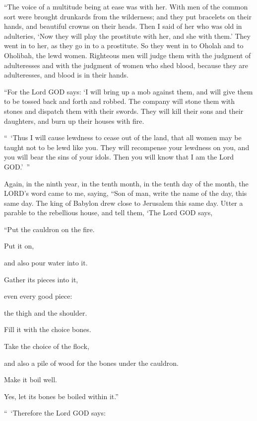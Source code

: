 \myverse{}“The voice of a multitude being at ease was with her. With men
of the common sort were brought drunkards from the wilderness; and they put bracelets on their hands,
and beautiful crowns on their heads.
\myverse{}Then I said of her who was old in adulteries, ‘Now they will play the prostitute
with her, and she with them.’
\myverse{}They went in to her, as they go in to a prostitute. So they went in to Oholah
and to Oholibah, the lewd women.
\myverse{}Righteous men will judge them with the judgment of adulteresses and with
the judgment of women who shed blood, because they are adulteresses, and blood is in their hands.

\myverse{}“For the Lord GOD says: ‘I will bring up a mob against them,
and will give them to be tossed back and forth and robbed.
\myverse{}The company will stone them with stones and dispatch them with their swords.
They will kill their sons and their daughters, and burn up their houses with fire.

\myverse{}“ ‘Thus I will cause lewdness to cease out of the land, that
all women may be taught not to be lewd like you.
\myverse{}They will recompense your lewdness on you, and you will bear the sins of
your idols. Then you will know that I am the Lord GOD.’ ”


\mychapter{} \myverse*{}Again, in the ninth year, in the tenth month, in the tenth day
of the month, the LORD’s word came to me, saying,
\myverse{}“Son of man, write the name of the day, this same day. The king of Babylon
drew close to Jerusalem this same day.
\myverse{}Utter a parable to the rebellious house, and tell them, ‘The Lord GOD says,

“Put the cauldron on the fire.

Put it on,

and also pour water into it.

\myverse{}Gather its pieces into it,

even every good piece:

the thigh and the shoulder.

Fill it with the choice bones.

\myverse{}Take the choice of the flock,

and also a pile of wood for the bones under the cauldron.

Make it boil well.

Yes, let its bones be boiled within it.”

\myverse{}“ ‘Therefore the Lord GOD says:

